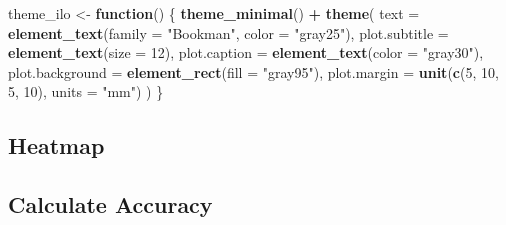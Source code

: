 \documentclass[]{book}
\newenvironment{Shaded}{\begin{snugshade}}{\end{snugshade}}
\newcommand{\KeywordTok}[1]{\textcolor[rgb]{0.13,0.29,0.53}{\textbf{#1}}}
\newcommand{\DataTypeTok}[1]{\textcolor[rgb]{0.13,0.29,0.53}{#1}}
\newcommand{\DecValTok}[1]{\textcolor[rgb]{0.00,0.00,0.81}{#1}}
\newcommand{\StringTok}[1]{\textcolor[rgb]{0.31,0.60,0.02}{#1}}
\newcommand{\OtherTok}[1]{\textcolor[rgb]{0.56,0.35,0.01}{#1}}
\newcommand{\ControlFlowTok}[1]{\textcolor[rgb]{0.13,0.29,0.53}{\textbf{#1}}}
\newcommand{\OperatorTok}[1]{\textcolor[rgb]{0.81,0.36,0.00}{\textbf{#1}}}
\newcommand{\NormalTok}[1]{#1}
\theoremstyle{definition}
\theoremstyle{definition}
\theoremstyle{definition}
\theoremstyle{remark}
\begin{document}
\begin{Shaded}
\begin{Highlighting}[]
\NormalTok{theme_ilo <-}\StringTok{ }\ControlFlowTok{function}\NormalTok{() \{}
  \KeywordTok{theme_minimal}\NormalTok{() }\OperatorTok{+}
\StringTok{  }\KeywordTok{theme}\NormalTok{(}
    \DataTypeTok{text =} \KeywordTok{element_text}\NormalTok{(}\DataTypeTok{family =} \StringTok{"Bookman"}\NormalTok{, }\DataTypeTok{color =} \StringTok{"gray25"}\NormalTok{),}
    \DataTypeTok{plot.subtitle =} \KeywordTok{element_text}\NormalTok{(}\DataTypeTok{size =} \DecValTok{12}\NormalTok{),}
    \DataTypeTok{plot.caption =} \KeywordTok{element_text}\NormalTok{(}\DataTypeTok{color =} \StringTok{"gray30"}\NormalTok{),}
    \DataTypeTok{plot.background =} \KeywordTok{element_rect}\NormalTok{(}\DataTypeTok{fill =} \StringTok{"gray95"}\NormalTok{),}
    \DataTypeTok{plot.margin =} \KeywordTok{unit}\NormalTok{(}\KeywordTok{c}\NormalTok{(}\DecValTok{5}\NormalTok{, }\DecValTok{10}\NormalTok{, }\DecValTok{5}\NormalTok{, }\DecValTok{10}\NormalTok{), }\DataTypeTok{units =} \StringTok{"mm"}\NormalTok{)}
\NormalTok{  )}
\NormalTok{\}}
\end{Highlighting}
\end{Shaded}

\subsection{Heatmap}\label{heatmap}

\begin{Shaded}
\end{Shaded}

\subsection{Calculate Accuracy}\label{calculate-accuracy}
\end{document}
